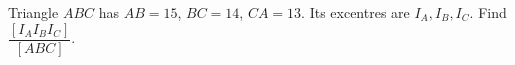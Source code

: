 Triangle $ABC$ has $AB=15$, $BC=14$, $CA=13$. Its excentres are $I_A,I_B,I_C$. Find $\dfrac{[I_AI_BI_C]}{[ABC]}$.
